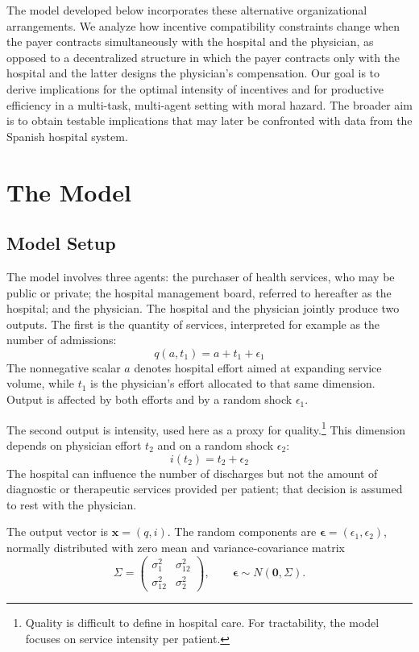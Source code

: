 ﻿\documentclass[12pt,letterpaper]{article}
\begin{document}
The model developed below incorporates these alternative organizational arrangements. We analyze how incentive compatibility constraints change when the payer contracts simultaneously with the hospital and the physician, as opposed to a decentralized structure in which the payer contracts only with the hospital and the latter designs the physician's compensation. Our goal is to derive implications for the optimal intensity of incentives and for productive efficiency in a multi-task, multi-agent setting with moral hazard. The broader aim is to obtain testable implications that may later be confronted with data from the Spanish hospital system.

\section{The Model}

\subsection{Model Setup}
The model involves three agents: the purchaser of health services, who may be public or private; the hospital management board, referred to hereafter as the hospital; and the physician. The hospital and the physician jointly produce two outputs. The first is the quantity of services, interpreted for example as the number of admissions:
\begin{equation*}\label{eq:qen}
  q(a,t_1)=a+t_1+\epsilon_1
\end{equation*}
The nonnegative scalar $a$ denotes hospital effort aimed at expanding service volume, while $t_1$ is the physician's effort allocated to that same dimension. Output is affected by both efforts and by a random shock $\epsilon_1$.

The second output is intensity, used here as a proxy for quality.\footnote{Quality is difficult to define in hospital care. For tractability, the model focuses on service intensity per patient.} This dimension depends on physician effort $t_2$ and on a random shock $\epsilon_2$:
\begin{equation*}\label{eq:ien}
  i(t_2)=t_2+\epsilon_2
\end{equation*}
The hospital can influence the number of discharges but not the amount of diagnostic or therapeutic services provided per patient; that decision is assumed to rest with the physician.

The output vector is $\bm{x}=(q,i)$. The random components are $\bm{\epsilon}=(\epsilon_1,\epsilon_2)$, normally distributed with zero mean and variance-covariance matrix
\[
\Sigma=
\begin{pmatrix}
\sigma_1^2 & \sigma_{12}^2 \\
\sigma_{12}^2 & \sigma_2^2
\end{pmatrix},
\qquad
\bm{\epsilon}\sim N(\mathbf{0},\Sigma).
\]
\end{document}
